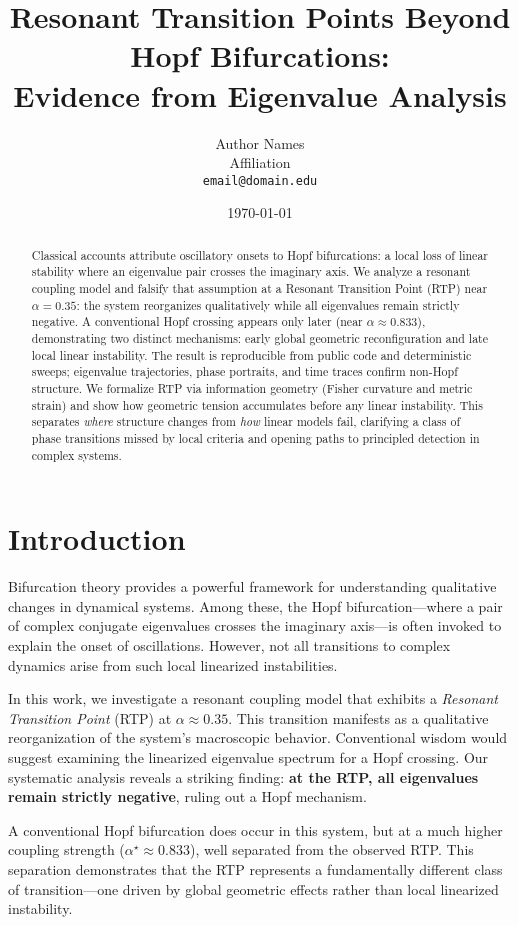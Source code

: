 \documentclass[11pt,twocolumn]{article}
\title{Resonant Transition Points Beyond Hopf Bifurcations:\\
Evidence from Eigenvalue Analysis}
\author{%
  Author Names\\
  Affiliation\\
  \texttt{email@domain.edu}
}
\date{\today}
\begin{document}
\maketitle

\begin{abstract}
Classical accounts attribute oscillatory onsets to Hopf bifurcations: a local loss of linear stability where an eigenvalue pair crosses the imaginary axis. We analyze a resonant coupling model and falsify that assumption at a Resonant Transition Point (RTP) near $\alpha\!=\!0.35$: the system reorganizes qualitatively while all eigenvalues remain strictly negative. A conventional Hopf crossing appears only later (near $\alpha\!\approx\!0.833$), demonstrating two distinct mechanisms: early global geometric reconfiguration and late local linear instability. The result is reproducible from public code and deterministic sweeps; eigenvalue trajectories, phase portraits, and time traces confirm non-Hopf structure. We formalize RTP via information geometry (Fisher curvature and metric strain) and show how geometric tension accumulates before any linear instability. This separates \emph{where} structure changes from \emph{how} linear models fail, clarifying a class of phase transitions missed by local criteria and opening paths to principled detection in complex systems.
\end{abstract}

\section{Introduction}

Bifurcation theory provides a powerful framework for understanding qualitative changes in dynamical systems.
Among these, the Hopf bifurcation—where a pair of complex conjugate eigenvalues crosses the imaginary axis—is
often invoked to explain the onset of oscillations. However, not all transitions to complex dynamics arise
from such local linearized instabilities.

In this work, we investigate a resonant coupling model that exhibits a \emph{Resonant Transition Point} (RTP)
at $\alpha \approx 0.35$. This transition manifests as a qualitative reorganization of the system's macroscopic
behavior. Conventional wisdom would suggest examining the linearized eigenvalue spectrum for a Hopf crossing.
Our systematic analysis reveals a striking finding: \textbf{at the RTP, all eigenvalues remain strictly negative},
ruling out a Hopf mechanism.

A conventional Hopf bifurcation does occur in this system, but at a much higher coupling strength
($\alpha^\star \approx 0.833$), well separated from the observed RTP. This separation demonstrates that the RTP
represents a fundamentally different class of transition—one driven by global geometric effects rather than
local linearized instability.
\end{document}
